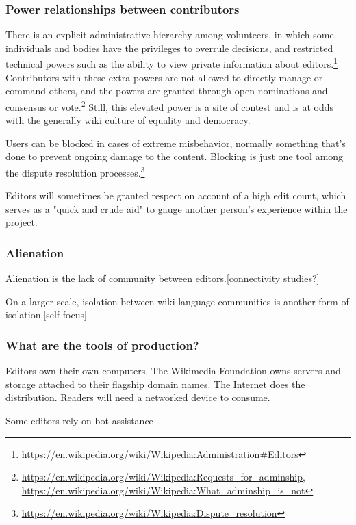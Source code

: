 \subsubsection{Power relationships between contributors}

There is an explicit administrative hierarchy among volunteers, in which some individuals and bodies have the privileges to overrule decisions, and restricted technical powers such as the ability to view private information about editors.\footnote{\url{https://en.wikipedia.org/wiki/Wikipedia:Administration\#Editors}}  Contributors with these extra powers are not allowed to directly manage or command others, and the powers are granted through open nominations and consensus or vote.\footnote{\url{https://en.wikipedia.org/wiki/Wikipedia:Requests_for_adminship}, \url{https://en.wikipedia.org/wiki/Wikipedia:What_adminship_is_not}}  Still, this elevated power is a site of contest and is at odds with the generally wiki culture of equality and democracy.

Users can be blocked in cases of extreme misbehavior, normally something that's done to prevent ongoing damage to the content.  Blocking is just one tool among the dispute resolution processes.\footnote{\url{https://en.wikipedia.org/wiki/Wikipedia:Dispute_resolution}}

Editors will sometimes be granted respect on account of a high edit count, which serves as a "quick and crude aid" to gauge another person's experience within the project.

\subsubsection{Alienation}

Alienation is the lack of community between editors.[connectivity studies?]

On a larger scale, isolation between wiki language communities is another form of isolation.[self-focus]

\subsubsection{What are the tools of production?}

Editors own their own computers.  The Wikimedia Foundation owns servers and storage attached to their flagship domain names.  The Internet does the distribution.  Readers will need a networked device to consume.

Some editors rely on bot assistance

